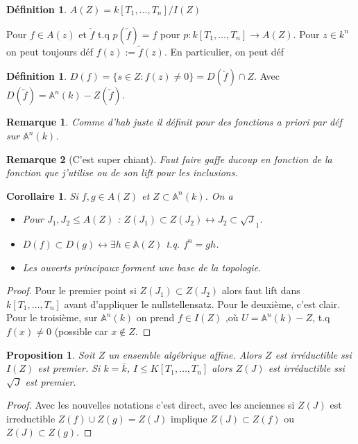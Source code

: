\documentclass[a4paper,12pt]{book}
\newcommand{\A}{\mathbb{A}}
\theoremstyle{plain}
\newtheorem{prop}[subsection]{Proposition}
\newtheorem{cor}[subsection]{Corollaire}
\newtheorem{rem}{Remarque}
\theoremstyle{definition}
\newtheorem{defn}[subsection]{Définition}
\theoremstyle{remark}
\begin{document}
\begin{defn}
    $A(Z)=k[T_1,\ldots,T_n]/I(Z)$
\end{defn}

Pour $f\in A(z)$ et $\tilde f$ t.q $p(\tilde f)= f$ pour 
$p\colon k[T_1, \ldots, T_n]\to A(Z)$. Pour $z\in k^n$ on peut toujours 
déf $f(z):=\tilde f(z)$. En particulier, on peut déf
\begin{defn}
    $D(f)=\{s\in Z : f(z)\ne 0\}=D(\tilde f)\cap Z$. Avec 
    $D(\tilde f)=\A^n(k)-Z(\tilde f)$.
\end{defn}
\begin{rem}
    Comme d'hab juste il définit pour des fonctions a priori par déf
    sur $\A^n(k)$.
\end{rem}
\begin{rem}[C'est super chiant]
    Faut faire gaffe ducoup en fonction de la fonction que j'utilise
    ou de son lift pour les inclusions.
\end{rem}
\begin{cor}
    Si $f,g\in A(Z)$ et $Z\subset \A^n(k)$. On a 
    \begin{itemize}
	\item Pour $J_1,J_2\leq A(Z)$ : 
	    $Z(J_1)\subset Z(J_2)\leftrightarrow J_2\subset \sqrt J_1$.
	\item $D(f)\subset D(g)\leftrightarrow \exists h\in \A(Z)$ t.q.
	    $f^n=gh$.
	\item Les ouverts principaux forment une base de la topologie.
    \end{itemize}
\end{cor}
\begin{proof}
    Pour le premier point si $Z(J_1)\subset Z(J_2)$ alors faut lift 
    dans $k[T_1, \ldots, T_n]$ avant d'appliquer le nullstellensatz.
    Pour le deuxième, c'est clair.
    Pour le troisième, sur $\A^n(k)$ on prend $f\in I(Z)$ ,où 
    $U=\A^n(k)-Z$, t.q $f(x)\ne 0$ (possible car $x\notin Z$.
\end{proof}
\begin{prop}
    Soit $Z$ un ensemble algébrique affine. Alors $Z$ est irréductible
    ssi $I(Z)$ est premier. Si $k=\bar k$, $I\leq K[T_1,\ldots,T_n]$
    alors $Z(J)$ est irréductible ssi $\sqrt J$ est premier.
\end{prop}
\begin{proof}
    Avec les nouvelles notations c'est direct, avec les anciennes 
    si $Z(J)$ est irreductible $Z(f)\cup Z(g)=Z(J)$ implique 
    $Z(J)\subset Z(f)$ ou $Z(J)\subset Z(g)$. 
\end{proof}
\end{document}
